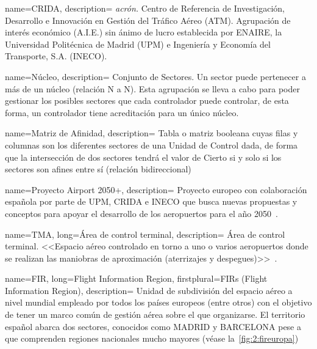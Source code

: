 {
    name={CRIDA},
    description=
    {   
        \textit{acrón.} Centro de Referencia de Investigación, Desarrollo e Innovación 
        en Gestión del Tráfico Aéreo (\gls{ATM}). Agrupación de interés económico (A.I.E.) sin ánimo de lucro 
        establecida por ENAIRE, la Universidad Politécnica de Madrid (UPM) e Ingeniería y Economía del Transporte, S.A. 
        (INECO).~\cite{CRIDA-web}
    }
}

{
    name={Núcleo},
    description=
    {   
        Conjunto de Sectores. Un sector puede pertenecer a más de un núcleo (relación N a N). Esta 
        agrupación se lleva a cabo para poder gestionar los posibles sectores que cada controlador puede controlar, de 
        esta 
        forma, un controlador tiene acreditación para un único núcleo.
    }
}

{
    name={Matriz de Afinidad},
    description=
    {   
        Tabla o matriz booleana cuyas filas y columnas son los diferentes sectores de 
        una Unidad de Control dada, de forma que la intersección de dos sectores tendrá el valor de Cierto si y solo si 
        los sectores son afines entre sí (relación bidireccional)
    }
}

{
    name={Proyecto Airport 2050+},
    description=
    {   
        Proyecto europeo con colaboración española por parte de UPM, CRIDA e INECO que busca nuevas propuestas y conceptos para apoyar el desarrollo de los aeropuertos para el año 2050~\cite{airports-web}.
    }
}

{
    name={TMA},
    long={Área de control terminal},
    description=
    {   
        Área de control terminal. <<Espacio aéreo controlado en torno a uno o varios aeropuertos 
        donde se realizan las maniobras de aproximación (aterrizajes y despegues)>>~\cite{ENAIRE-web}.
    }
}

{
    name={FIR},
    long={Flight Information Region},
    firstplural={FIRs (Flight Information Region)},
    description=
    {   
        Unidad de subdivisión del espacio aéreo a nivel mundial empleado por todos los países europeos (entre otros) 
        con el objetivo de tener un marco común de gestión aérea sobre el que organizarse. El territorio español abarca 
        dos sectores, conocidos como MADRID y BARCELONA pese a que comprenden regiones nacionales mucho mayores 
        (véase la~\autoref{fig:2:fireuropa})
    }
}



